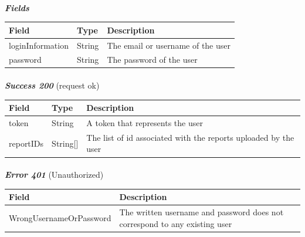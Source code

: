 						\paragraph{}
							\textcolor{myBlue}{\textit{\textbf{Fields}}}
							\vspace{-2mm}
							\begin{table}[!h]
								\begin{tabular}{L{0.25\textwidth}L{0.15\textwidth}L{0.48\textwidth}}
									\toprule
									\textbf{Field} & \textbf{Type} & \textbf{Description} \\
									\midrule
								 	loginInformation & String & The email or username of the user \\
								 	password & String & The password of the user \\
								 	\bottomrule
								\end{tabular}
							\end{table}
						\paragraph{}
							\textcolor{myGreen}{\textit{\textbf{Success 200}}} (request ok)
							\vspace{-2mm}
							\begin{table}[!h]
								\begin{tabular}{L{0.2\textwidth}L{0.15\textwidth}L{0.53\textwidth}}
									\toprule
									\textbf{Field} & \textbf{Type} & \textbf{Description} \\
									\midrule
									token & String & A token that represents the user \\
									reportIDs & String[] & The list of id associated with the reports uploaded by the user \\
								 	\bottomrule
								\end{tabular}
							\end{table}
						\vspace{-5mm}
						\paragraph{}
							\textcolor{myRed}{\textit{\textbf{Error 401}}} (Unauthorized)
							\vspace{-2mm}
							\begin{table}[!h]
								\begin{tabular}{L{0.4\textwidth}L{0.52\textwidth}}
									\toprule
									\textbf{Field} & \textbf{Description} \\
									\midrule
								  	WrongUsernameOrPassword & The written username and password does not correspond to any existing user \\
								 	\bottomrule
								\end{tabular}
							\end{table}
							

